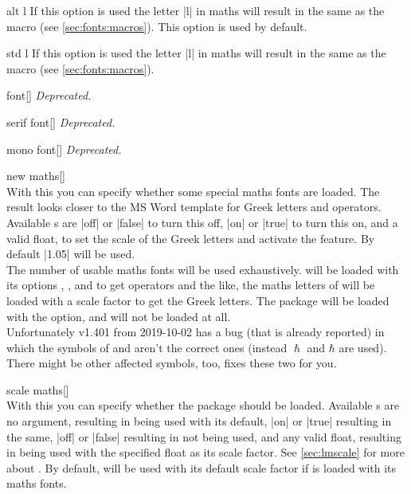 \begin{describeopt}{alt l}
  If this option is used the letter |l| in maths will result in the same as the
   macro (see \autoref{sec:fonts:macros}). This option is used by
  default.
\end{describeopt}
\begin{describeopt}{std l}
  If this option is used the letter |l| in maths will result in the same as the
   macro (see \autoref{sec:fonts:macros}).
\end{describeopt}
\begin{describeopt}{font}[]
  \emph{Deprecated.}
\end{describeopt}
\begin{describeopt}{serif font}[]
  \emph{Deprecated.}
\end{describeopt}
\begin{describeopt}{mono font}[]
  \emph{Deprecated.}
\end{describeopt}
\begin{describeopt}{new maths}[]
  \\
  With this you can specify whether some special maths fonts are loaded. The
  result looks closer to the MS Word template for Greek letters and
  operators.\\
  Available s are |off| or |false| to turn this off, |on| or |true|
  to turn this on, and a valid float, to set the scale of the Greek letters and
  activate the feature.  By default |1.05| will be used.\\
  The number of usable maths fonts will be used exhaustively. 
  will be loaded with its options , ,
   and  to get operators and the like, the
  maths letters of  will be loaded with a scale factor to get the
  Greek letters.  The  package will be loaded with the 
  option, and  will not be loaded at all.\\
  Unfortunately  v1.401 from 2019-10-02 has a bug (that is
  already reported) in which the symbols of  and  aren't
  the correct ones (instead $\hslash$ and $\hbar$ are used). There might be
  other affected symbols, too,  fixes these two for you.
\end{describeopt}
\begin{describeopt}{scale maths}[]
  \\
  With this you can specify whether the  package should be
  loaded. Available s are no argument, resulting in
   being used with its default, |on| or |true| resulting in the
  same, |off| or |false| resulting in  not being used, and any
  valid float, resulting in  being used with the specified float
  as its scale factor. See \autoref{sec:lmscale} for more about
  . By default,  will be used with its default
  scale factor if  is loaded with its maths fonts.
\end{describeopt}


